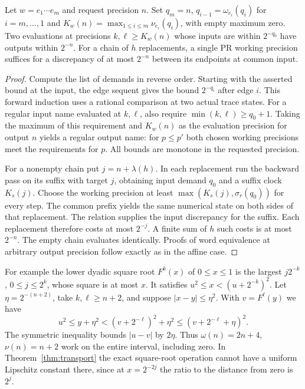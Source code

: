 \begin{proposition}\label{prop:moduli}
Let $w=e_1\cdots e_m$ and request precision $n$. Set $q_m=n$, $q_{i-1}=\omega_{e_i}(q_i)$ for $i=m,\ldots,1$ and $K_w(n)=\max_{1\le i\le m}\nu_{e_i}(q_i)$, with empty maximum zero. Two evaluations at precisions $k,\ell\ge K_w(n)$ whose inputs are within $2^{-q_0}$ have outputs within $2^{-n}$. For a chain of $h$ replacements, a single PR working precision suffices for a discrepancy of at most $2^{-n}$ between its endpoints at common input.
\end{proposition}
\begin{proof}
Compute the list of demands in reverse order. Starting with the asserted bound at the input, the edge sequent gives the bound $2^{-q_i}$ after edge $i$. This forward induction uses a rational comparison at two actual trace states. For a regular input name evaluated at $k,\ell$, also require $\min(k,\ell)\ge q_0+1$. Taking the maximum of this requirement and $K_w(n)$ as the evaluation precision for output $n$ yields a regular output name: for $p\le p'$ both chosen working precisions meet the requirements for $p$. All bounds are monotone in the requested precision.

For a nonempty chain put $j=n+\lambda(h)$. In each replacement run the backward pass on its suffix with target $j$, obtaining input demand $q_0$ and a suffix clock $K_s(j)$. Choose the working precision at least $\max(K_s(j),\sigma_r(q_0))$ for every step. The common prefix yields the same numerical state on both sides of that replacement. The relation supplies the input discrepancy for the suffix. Each replacement therefore costs at most $2^{-j}$. A finite sum of $h$ such costs is at most $2^{-n}$. The empty chain evaluates identically. Proofs of word equivalence at arbitrary output precision follow exactly as in the affine case.
\end{proof}

For example the lower dyadic square root $F^k(x)$ of $0\le x\le1$ is the largest $j2^{-k}$, $0\le j\le 2^k$, whose square is at most $x$. It satisfies $u^2\le x<(u+2^{-k})^2$. Let $\eta=2^{-(n+2)}$, take $k,\ell\ge n+2$, and suppose $|x-y|\le\eta^2$. With $v=F^\ell(y)$ we have
\[
 u^2\le y+\eta^2 < (v+2^{-\ell})^2+\eta^2
       \le (v+2^{-\ell}+\eta)^2 .
\]
The symmetric inequality bounds $|u-v|$ by $2\eta$. Thus $\omega(n)=2n+4$, $\nu(n)=n+2$ work on the entire interval, including zero. In Theorem~\ref{thm:transport} the exact square-root operation cannot have a uniform Lipschitz constant there, since at $x=2^{-2j}$ the ratio to the distance from zero is $2^j$.
